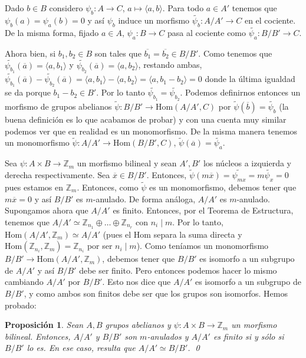 \documentclass[12pt]{book}
\newtheorem{prop}[teo]{Proposición}
\theoremstyle{definition}
\newcommand{\ZZ}{\mathbb{Z}}      %
\renewcommand{\hom}{\mathrm{Hom}}
\begin{document}
Dado $b\in B$ considero $\psi_b:A\to C$, $a\mapsto \langle a,b\rangle$. Para todo $a\in A'$ tenemos que $\psi_b(a)=\psi_a(b)=0$ y así $\psi_b$ induce un morfismo $\widetilde{\psi_b}:A/A'\to C$ en el cociente. De la misma forma, fijado $a\in A$, $\psi_a:B\to C$ pasa al cociente como $\widetilde{\psi_a}:B/B'\to C$.

Ahora bien, si $b_1,b_2\in B$ son tales que $\overline{b_1}=\overline{b_2}\in B/B'$. Como tenemos que $\widetilde{\psi_{b_1}}(\overline{a}) = \langle a,b_1\rangle$ y $\widetilde{\psi_{b_2}}(\overline{a}) = \langle a,b_2\rangle$, restando ambas, $\widetilde{\psi_{b_1}}(\overline{a})-\widetilde{\psi_{b_2}}(\overline{a}) = \langle a,b_1\rangle - \langle a,b_2\rangle = \langle a,b_1-b_2\rangle = 0$ donde la última igualdad se da porque $b_1-b_2\in B'$. Por lo tanto $\widetilde{\psi_{b_1}}=\widetilde{\psi_{b_2}}$. Podemos definirnos entonces un morfismo de grupos abelianos $\widetilde{\psi}:B/B'\to \hom(A/A',C)$ por $\widetilde{\psi}(\overline{b})=\widetilde{\psi_b}$ (la buena definición es lo que acabamos de probar) y con una cuenta muy similar podemos ver que en realidad es un monomorfismo. De la misma manera tenemos un monomorfismo $\widetilde{\psi}:A/A'\to\hom(B/B',C)$, $\widetilde{\psi}(\overline{a})=\widetilde{\psi_a}$.

Sea $\psi:A\times B\to \ZZ_m$ un morfismo bilineal y sean $A',B'$ los núcleos a izquierda y derecha respectivamente. Sea $\overline{x}\in B/B'$. Entonces, $\widetilde{\psi}(m\overline{x}) = \widetilde{\psi_{mx}} = m\widetilde{\psi_x} = 0$ pues estamos en $\ZZ_m$. Entonces, como $\widetilde{\psi}$ es un monomorfismo, debemos tener que $m\overline{x}=0$ y así $B/B'$ es $m$-anulado. De forma análoga, $A/A'$ es $m$-anulado. Supongamos ahora que $A/A'$ es finito. Entonces, por el Teorema de Estructura, tenemos que $A/A' \simeq \ZZ_{n_1}\oplus\ldots\oplus \ZZ_{n_r}$ con $n_i\mid m$. Por lo tanto, $\hom(A/A',\ZZ_m)\simeq A/A'$ (pues el $\hom$ separa la suma directa y $\hom(\ZZ_{n_i},\ZZ_m)= \ZZ_{n_i}$ por ser $n_i\mid m$). Como teníamos un monomorfismo $B/B'\to\hom(A/A',\ZZ_m)$, debemos tener que $B/B'$ es isomorfo a un subgrupo de $A/A'$ y así $B/B'$ debe ser finito. Pero entonces podemos hacer lo mismo cambiando $A/A'$ por $B/B'$. Esto nos dice que $A/A'$ es isomorfo a un subgrupo de $B/B'$, y como ambos son finitos debe ser que los grupos son isomorfos. Hemos probado:

\begin{prop}
Sean $A,B$ grupos abelianos y $\psi:A\times B\to\ZZ_m$ un morfismo bilineal. Entonces, $A/A'$ y $B/B'$ son $m$-anulados y $A/A'$ es finito si y sólo si $B/B'$ lo es. En ese caso, resulta que $A/A'\simeq B/B'$. \qed
\end{prop}
\end{document}
